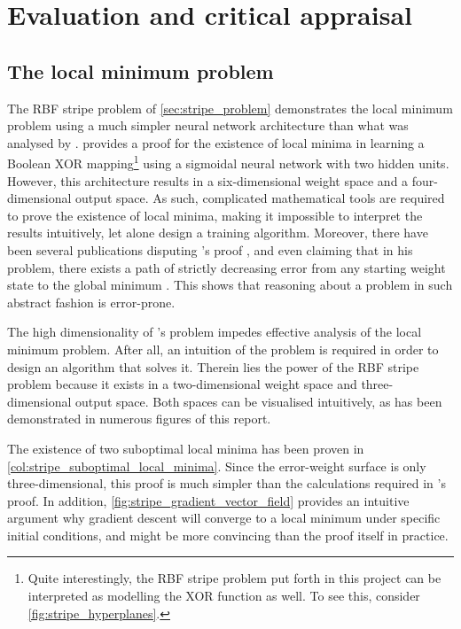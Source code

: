\chapter{Evaluation and critical appraisal}

\section{The local minimum problem}
\label{sec:eval_local_minimum_problem}
The RBF stripe problem of \ref{sec:stripe_problem} demonstrates the local minimum problem using a much simpler neural network architecture than what was analysed by \textcite{blum1989}. 
\citeauthor{blum1989} provides a proof for the existence of local minima in learning a Boolean XOR mapping\footnote{Quite interestingly, the RBF stripe problem put forth in this project can be interpreted as modelling the XOR function as well. To see this, consider \ref{fig:stripe_hyperplanes}.} using a sigmoidal neural network with two hidden units.
However, this architecture results in a six-dimensional weight space and a four-dimensional output space. 
As such, complicated mathematical tools are required to prove the existence of local minima, making it impossible to interpret the results intuitively, let alone design a training algorithm.
Moreover, there have been several publications disputing \citeauthor{blum1989}'s proof \cite{hamey1998,mizutani2010}, and even claiming that in his problem, there exists a path of strictly decreasing error from any starting weight state to the global minimum \cite{sprinkhuizen1999}.
This shows that reasoning about a problem in such abstract fashion is error-prone.

The high dimensionality of \citeauthor{blum1989}'s problem impedes effective analysis of the local minimum problem.
After all, an intuition of the problem is required in order to design an algorithm that solves it.
Therein lies the power of the RBF stripe problem because it exists in a two-dimensional weight space and three-dimensional output space.
Both spaces can be visualised intuitively, as has been demonstrated in numerous figures of this report.

The existence of two suboptimal local minima has been proven in \ref{col:stripe_suboptimal_local_minima}.
Since the error-weight surface is only three-dimensional, this proof is much simpler than the calculations required in \citeauthor{blum1989}'s proof.
In addition, \ref{fig:stripe_gradient_vector_field} provides an intuitive argument why gradient descent will converge to a local minimum under specific initial conditions, and might be more convincing than the proof itself in practice.

